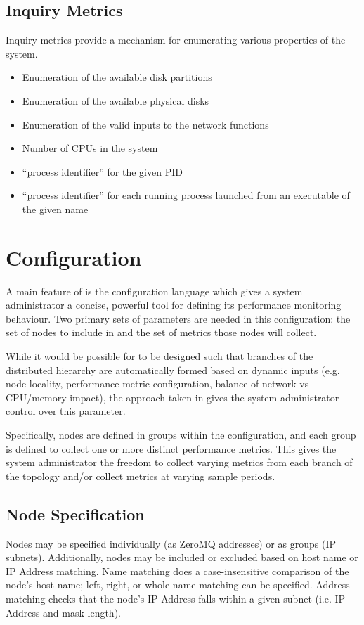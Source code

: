 \subsection{Inquiry Metrics}
Inquiry metrics provide a mechanism for enumerating various properties of the system.
\begin{itemize}
\item Enumeration of the available disk partitions
\item Enumeration of the available physical disks
\item Enumeration of the valid inputs to the network functions
\item Number of CPUs in the system
\item ``process identifier'' for the given PID
\item ``process identifier'' for each running process launched from an executable of the given name
\end{itemize}

\section{Configuration}
\label{configuration}

A main feature of \dcamp is the configuration language which gives a system administrator a concise, powerful tool for
defining its performance monitoring behaviour. Two primary sets of parameters are needed in this configuration: the set
of nodes to include in \dcamp and the set of metrics those nodes will collect.

While it would be possible for \dcamp to be designed such that branches of the distributed hierarchy are automatically
formed based on dynamic inputs (e.g. node locality, performance metric configuration, balance of network vs CPU/memory
impact), the approach taken in \dcamp gives the system administrator control over this parameter.

Specifically, nodes are defined in groups within the \dcamp configuration, and each group is defined to collect one or
more distinct performance metrics. This gives the system administrator the freedom to collect varying metrics from each
branch of the topology and/or collect metrics at varying sample periods.

\subsection{Node Specification}

Nodes may be specified individually (as ZeroMQ addresses) or as groups (IP subnets). Additionally, nodes may be included
or excluded based on host name or IP Address matching. Name matching does a case-insensitive comparison of the node's
host name; left, right, or whole name matching can be specified. Address matching checks that the node's IP Address
falls within a given subnet (i.e. IP Address and mask length).

